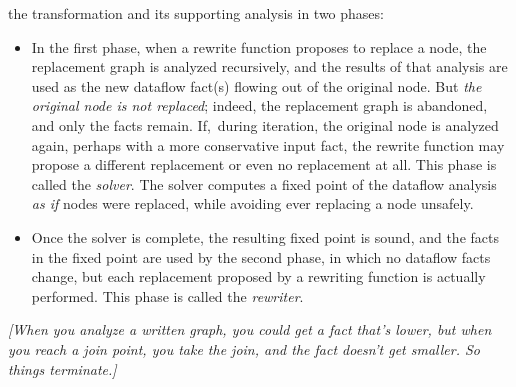 \documentclass[blockstyle,preprint,nocopyrightspace]{sigplanconf}
\newcommand{\authornote}[1]{{\em #1}}
\def\authornote#1{\unskip\relax}
\newcommand{\simon}[1]{\authornote{SLPJ: #1}}
\newcommand\seclabel[1]{\label{sec:#1}}
\begin{document}
the transformation
and its supporting
analysis in two phases:\seclabel{solver-phase}
\begin{itemize}
\item
In the first phase, when a rewrite function proposes to replace a
node, the replacement graph is analyzed recursively, and the results
of that analysis are used as the new dataflow
fact(s) flowing out of the original node.
But \emph{the original node is not replaced}; indeed, the replacement
graph is abandoned, and only the facts remain.
If,~during iteration, the original node is analyzed again, perhaps
with a more conservative input fact, the rewrite function may propose
a different replacement or even no replacement at all.
This phase is called the \emph{solver}.
The solver computes a fixed point of the dataflow analysis
\emph{as if} nodes were replaced, while avoiding ever replacing a node
unsafely.
\simon{The rewrite functions must presumably satisfy
some monotonicity property.  Something like: given a more informative
fact, the rewrite function will rewrite a node to a more informative graph
(in the fact lattice.).
\textbf{NR}: actually the only obligation of the rewrite function is
to preserve observable behavior.  There's no requirement that it be
monotonic or indeed that it do anything useful.  It just has to
preserve semantics (and be a pure function of course).
\textbf{SLPJ} In that case I think I could cook up a program that
would never reach a fixpoint. Imagine a liveness analysis with a loop;
x is initially unused anywhere.
At some assignment node inside the loop, the rewriter behaves as follows: 
if (and only if) x is dead downstream, 
make it alive by rewriting the assignment to mention x.
Now in each successive iteration x will go live/dead/live/dead etc.  I
maintain my claim that rewrite functions must satisfy some
monotonicity property.
\textbf{JD}: in the example you cite, monotonicity of facts at labels
means x cannot go live/dead/live/dead etc.  The only way we can think
of not to terminate is infinite ``deep rewriting.''
}
\item
Once the solver is complete, the resulting fixed point is sound,
and the facts in the fixed point are used by the second phase, in which
no dataflow facts change, but
each replacement proposed by a rewriting function is actually
performed.
This phase is called the \emph{rewriter}.
\end{itemize}


\emph{[When you analyze a written graph, you could get a fact that's lower,
but when you reach a join point, you take the join, and the fact
doesn't get smaller.  So things terminate.]}
\end{document}
